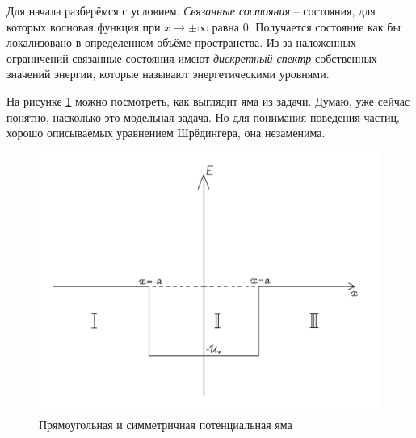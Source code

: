 Для начала разберёмся с условием. \textit{Связанные состояния} – состояния, для которых волновая функция при $x \rightarrow \pm \infty$ равна $0$. Получается состояние как бы локализовано в определенном объёме пространства. Из-за наложенных ограничений связанные состояния имеют \textit{дискретный спектр} собственных значений энергии, которые называют энергетическими уровнями.

На рисунке \ref{fig 3.1} можно посмотреть, как выглядит яма из задачи. Думаю, уже сейчас понятно, насколько это модельная задача. Но для понимания поведения частиц, хорошо описываемых уравнением Шрёдингера, она незаменима.
\begin{figure}[!ht]
\centering
\includegraphics[scale=0.27]{class_3/images/hole.png}
\caption{Прямоугольная и симметричная потенциальная яма}
\label{fig 3.1}
\end{figure}

